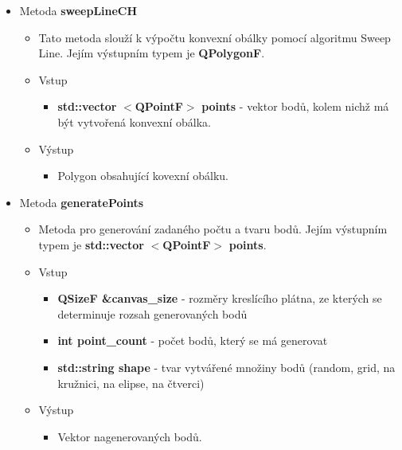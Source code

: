 \documentclass[a4paper, 12pt]{article}
\begin{document}
\begin{itemize}
	\item Metoda \textbf{sweepLineCH}
		\begin{itemize}
			\item Tato metoda slouží k výpočtu konvexní obálky pomocí algoritmu Sweep Line. Jejím výstupním typem je \textbf{QPolygonF}.
			\item Vstup
				\begin{itemize}
					\item \textbf{std::vector} $<$\textbf{QPointF}$>$ \textbf{points} - vektor bodů, kolem nichž má být vytvořená konvexní obálka.
				\end{itemize}
			\item Výstup
				\begin{itemize}
					\item Polygon obsahující kovexní obálku.
				\end{itemize} 
		\end{itemize}

	\item Metoda \textbf{generatePoints}
		\begin{itemize}
			\item Metoda pro generování zadaného počtu a tvaru bodů. Jejím výstupním typem je \textbf{std::vector} $<$\textbf{QPointF}$>$ \textbf{points}.
			\item Vstup
				\begin{itemize}
					\item \textbf{QSizeF \&canvas\_size} - rozměry kreslícího plátna, ze kterých se determinuje rozsah generovaných bodů
					\item \textbf{int point\_count} - počet bodů, který se má generovat
					\item \textbf{std::string shape} - tvar vytvářené množiny bodů (random, grid, na kružnici, na elipse, na čtverci)
				\end{itemize}
			\item Výstup
				\begin{itemize}
					\item Vektor nagenerovaných bodů.
				\end{itemize}
		\end{itemize}


\end{itemize}
\end{document}
